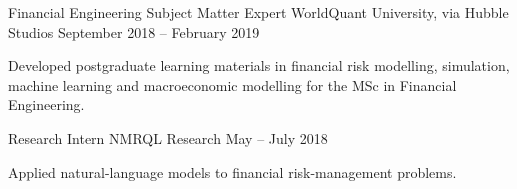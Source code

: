\begin{cventries}
  \cventry
  {Financial Engineering Subject Matter Expert}
  {WorldQuant University, via Hubble Studios}
  {}
  {September 2018 -- February 2019}
  {
    \begin{cvitems}
    \item {Developed postgraduate learning materials in financial
        risk modelling, simulation, machine learning and macroeconomic
      modelling for the MSc in Financial Engineering.}
  \end{cvitems}}
  \cventry
  {Research Intern}
  {NMRQL Research}
  {}
  {May -- July 2018}
  {
    \begin{cvitems}
    \item {Applied natural-language models to financial
      risk-management problems.}
  \end{cvitems}}
\end{cventries}
